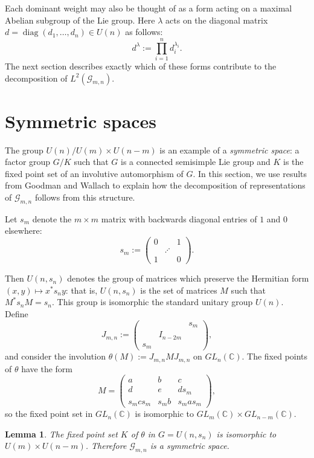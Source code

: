 \documentclass[12pt]{article}
\numberwithin{equation}{section}
\theoremstyle{plainsl}
\newtheorem{lemma}[theorem]{Lemma}
\newcommand\defn[1]{\textsl{#1}}
\newcommand\la{\lambda}
\renewcommand\th{\theta} %
\newcommand\cx{{\mathbb C}}%
\newcommand\gras[2]{\mathcal{G}_{#1,#2}}
\newcommand\opk[1]{\mathop{\mathrm{#1}}\nolimits}
\newcommand\diag{\opk{diag}}
\begin{document}
Each dominant weight may also be thought of as a form acting on a maximal Abelian subgroup of the Lie group. Here $\la$ acts on the diagonal matrix $d =\diag(d_1,\ldots,d_n) \in U(n)$ as follows:
\[
d^{\la} := \prod_{i=1}^n d_i^{\la_i}.
\]
The next section describes exactly which of these forms contribute to the decomposition of $L^2(\gras{m}{n})$.

\section{Symmetric spaces}
\label{sec:symmetric}

The group $U(n)/U(m) \times U(n-m)$ is an example of a \defn{symmetric space}: a factor group $G/K$ such that $G$ is a connected semisimple Lie group and $K$ is the fixed point set of an involutive automorphism of $G$. In this section, we use results from Goodman and Wallach \cite{gw1} to explain how the decomposition of representations of $\gras{m}{n}$ follows from this structure.

Let $s_m$ denote the $m \times m$ matrix with backwards diagonal entries of $1$ and $0$ elsewhere:
\[
s_m := \left(\begin{matrix} 
0 & & 1 \\
& \iddots & \\
1 & & 0
                 \end{matrix} \right).
\]

Then $U(n,s_n)$ denotes the group of matrices which preserve the Hermitian form $(x,y) \mapsto x^*s_ny$: that is, $U(n,s_n)$ is the set of matrices $M$ such that $M^*s_nM = s_n$. This group is isomorphic the standard unitary group $U(n)$. Define
\[
J_{m,n} := \left(\begin{matrix} 
& & s_m \\
& I_{n-2m} & \\
s_m & &
                 \end{matrix} \right),
\]
and consider the involution $\th(M) := J_{m,n}MJ_{m,n}$ on $GL_n(\cx)$. The fixed points of $\th$ have the form 
\[
M = \left(\begin{matrix} 
a & b & c \\
d & e & ds_m \\
s_mcs_m & s_mb & s_mas_m 
                 \end{matrix} \right),
\]
so the fixed point set in $GL_n(\cx)$ is isomorphic to $GL_m(\cx) \times GL_{n-m}(\cx)$. 

\begin{lemma}
The fixed point set $K$ of $\th$ in $G = U(n,s_n)$ is isomorphic to $U(m) \times U(n-m)$. Therefore $\gras{m}{n}$ is a symmetric space.
\end{lemma}
\end{document}

